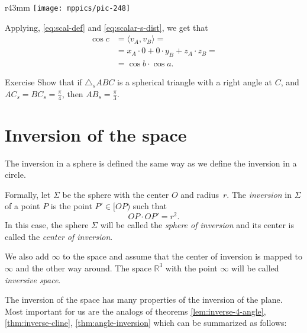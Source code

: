 {

\begin{wrapfigure}{r}{43mm}
\centering
\texttt{[image: mppics/pic-248]}
\end{wrapfigure}

Applying, \ref{eq:scal-def} and \ref{eq:scalar-s-dist}, we get that
\begin{align*}
\cos c &=\langle v_A,v_B\rangle=
\\
&=x_A\cdot 0+0\cdot y_B+z_A\cdot z_B=
\\
&=\cos b\cdot\cos a.
\end{align*}
\qedsf

\begin{thm}{Exercise}\label{ex:2(pi/4)=pi/3}
Show that 
if $\triangle_sABC$ is a spherical triangle with a right angle at $C$,
and $AC_s=BC_s=\tfrac\pi4$, then $AB_s=\tfrac\pi3$.
\end{thm}

}

\section*{Inversion of the space}

The inversion in a sphere is defined the same way as we define the inversion in a circle.

Formally, let $\Sigma$ be the sphere with the center $O$ and radius~$r$.
The \emph{inversion} in $\Sigma$ of a point $P$ is the point $P'\in[OP)$ such that
$$OP\cdot OP'=r^2.$$
In this case, the sphere $\Sigma$  will be called the 
\emph{sphere of inversion} 
and its center is called the \emph{center of inversion}.

We also add $\infty$ to the space and assume that the center of inversion is mapped to $\infty$ and the other way around. 
The space $\mathbb{R}^3$ with the point $\infty$ will be called \emph{inversive space}.

The inversion of the space 
has many properties 
of the inversion of the plane.
Most important for us are the analogs of theorems \ref{lem:inverse-4-angle}, \ref{thm:inverse-cline}, \ref{thm:angle-inversion} which can be summarized as follows:

